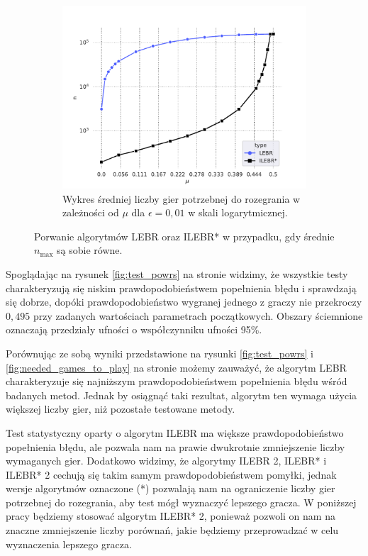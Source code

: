 \documentclass[inzynierska]{pwr_wmat_praca_dyplomowa}
\theoremstyle{plain}
\numberwithin{theorem}{chapter}
\theoremstyle{definition}
\numberwithin{theorem}{chapter}
\newcommand{\nmax}{n_{\text{max}}}
\begin{document}
\begin{figure}
\begin{subfigure}{.5\textwidth}
		\end{subfigure}%
		\begin{subfigure}[r]{.5\textwidth}
			\centering
			\includegraphics[width=1\linewidth]{imagens/needed_games_to_play_same_n_max_log.pdf}
			\caption{Wykres średniej liczby gier potrzebnej do rozegrania w zależności od $\mu$ dla $\epsilon=0,01$ w skali logarytmicznej.}
			\label{fig:game_to_play_same_n_max}
		\end{subfigure}
		\caption{Porwanie algorytmów LEBR oraz ILEBR* w przypadku, gdy średnie $\nmax$ są sobie równe.}
		\label{fig:same_n_max}
	\end{figure}
	Spoglądając na rysunek \ref{fig:test_powrs} na stronie \pageref{fig:test_powrs} widzimy, że wszystkie testy charakteryzują się niskim prawdopodobieństwem popełnienia błędu i sprawdzają się dobrze, dopóki prawdopodobieństwo wygranej jednego z graczy nie przekroczy $0,495$ przy zadanych wartościach parametrach początkowych. Obszary ściemnione oznaczają przedziały ufności o współczynniku ufności 95\%.
	
	Porównując ze sobą wyniki przedstawione na rysunki \ref{fig:test_powrs} i \ref{fig:needed_games_to_play} na stronie  \pageref{fig:needed_games_to_play} możemy zauważyć, że algorytm LEBR charakteryzuje się najniższym prawdopodobieństwem popełnienia błędu wśród badanych metod.
	Jednak by osiągnąć taki rezultat, algorytm ten wymaga użycia większej liczby gier, niż pozostałe testowane metody.
	
	Test statystyczny oparty o algorytm ILEBR ma większe prawdopodobieństwo popełnienia błędu, ale pozwala nam na prawie dwukrotnie zmniejszenie liczby wymaganych gier. Dodatkowo widzimy, że algorytmy  ILEBR 2, ILEBR* i ILEBR* 2 cechują się takim samym prawdopodobieństwem pomyłki, jednak wersje algorytmów oznaczone (*) pozwalają nam na ograniczenie liczby gier potrzebnej do rozegrania, aby test mógł wyznaczyć lepszego gracza. W poniższej pracy będziemy stosować algorytm ILEBR* 2, ponieważ pozwoli on nam na znaczne zmniejszenie liczby porównań, jakie będziemy przeprowadzać w celu wyznaczenia lepszego gracza. 
	
\end{document}

